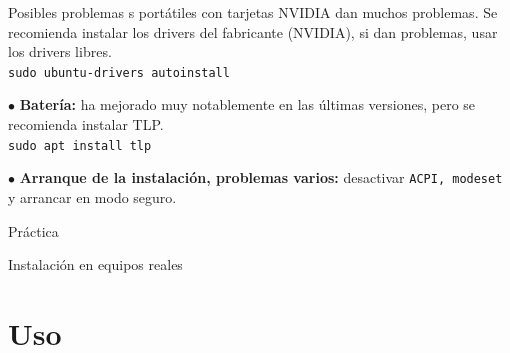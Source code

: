 \documentclass[12pt]{beamer}
\begin{document}
\begin{frame}{Posibles problemas}
s portátiles con tarjetas NVIDIA dan muchos problemas. Se recomienda instalar los drivers del fabricante (NVIDIA), si dan problemas, usar los drivers libres.\\
	\hfill \texttt{sudo ubuntu-drivers autoinstall}
	
	$\bullet$ \textbf{Batería:} ha mejorado muy notablemente en las últimas versiones, pero se recomienda instalar TLP.\\
	\hfill \texttt{sudo apt install tlp}
	
	$\bullet$ \textbf{Arranque de la instalación, problemas varios:} desactivar \texttt{ACPI, modeset} y arrancar en modo seguro.
\end{frame}

\begin{frame}{Práctica}
\end{frame}

\begin{frame}{Instalación en equipos reales}
\end{frame}

\section{Uso}
\end{document}
